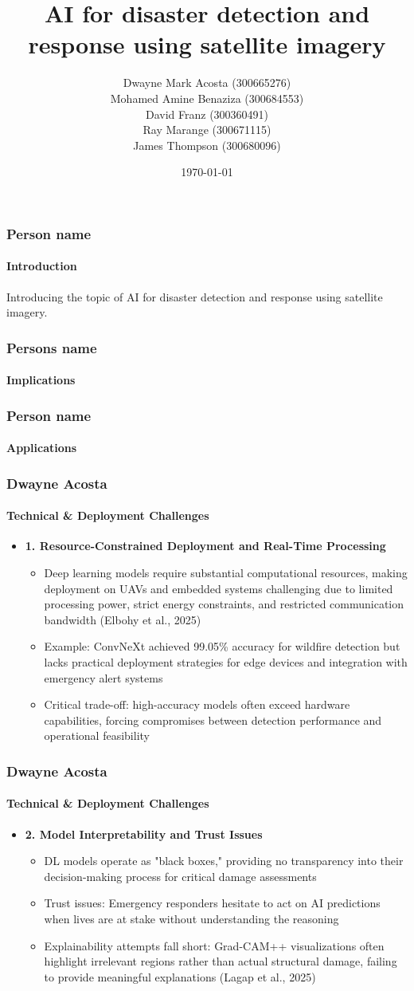 \documentclass{beamer}
\title{AI for disaster detection and response using satellite imagery}
\author{Dwayne Mark Acosta (300665276) \\ Mohamed Amine Benaziza (300684553) \\ David Franz (300360491) \\ Ray Marange (300671115) \\ James Thompson (300680096)}
\date{\today}
\newcommand{\namedframe}[3]{
  \begin{frame}
    \frametitle{#1}
    \framesubtitle{#2}
    #3
  \end{frame}
}
\begin{document}
\frame{\titlepage}

\namedframe{Person name}{Introduction}{
  Introducing the topic of AI for disaster detection and response using satellite imagery.
}
\namedframe{Persons name}{Implications}{

}
\namedframe{Person name}{Applications}{

}

\namedframe{Dwayne Acosta}{Technical \& Deployment Challenges}{
\begin{itemize}
    \item \textbf{1. Resource-Constrained Deployment and Real-Time Processing}
    \begin{itemize}
        \item Deep learning models require substantial computational resources, making deployment on UAVs and embedded systems challenging due to limited processing power, strict energy constraints, and restricted communication bandwidth (Elbohy et al., 2025)
        \item Example: ConvNeXt achieved 99.05\% accuracy for wildfire detection but lacks practical deployment strategies for edge devices and integration with emergency alert systems
        \item Critical trade-off: high-accuracy models often exceed hardware capabilities, forcing compromises between detection performance and operational feasibility
    \end{itemize}
\end{itemize}
}

\namedframe{Dwayne Acosta}{Technical \& Deployment Challenges}{
\begin{itemize}
    \item \textbf{2. Model Interpretability and Trust Issues}
    \begin{itemize}
        \item DL models operate as "black boxes," providing no transparency into their decision-making process for critical damage assessments
        \item Trust issues: Emergency responders hesitate to act on AI predictions when lives are at stake without understanding the reasoning
        \item Explainability attempts fall short: Grad-CAM++ visualizations often highlight irrelevant regions rather than actual structural damage, failing to provide meaningful explanations (Lagap et al., 2025)
    \end{itemize}
\end{itemize}
}
\end{document}
